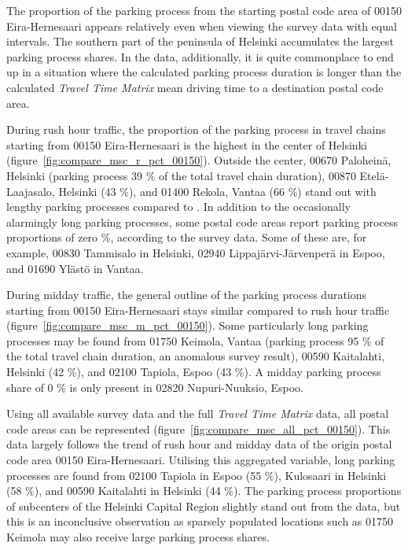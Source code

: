 The proportion of the parking process from the starting postal code area of 00150 Eira-Hernesaari appears relatively even when viewing the survey data with equal intervals. The southern part of the peninsula of Helsinki accumulates the largest parking process shares. In the  data, additionally, it is quite commonplace to end up in a situation where the calculated parking process duration is longer than the calculated \textit{Travel Time Matrix} mean driving time to a destination postal code area.

During rush hour traffic, the proportion of the parking process in travel chains starting from 00150 Eira-Hernesaari is the highest in the center of Helsinki (figure~\ref{fig:compare_msc_r_pct_00150}). Outside the center, 00670 Paloheinä, Helsinki (parking process 39 \% of the total travel chain duration), 00870 Etelä-Laajasalo, Helsinki (43 \%), and 01400 Rekola, Vantaa (66 \%) stand out with lengthy parking processes compared to . In addition to the occasionally alarmingly long parking processes, some postal code areas report parking process proportions of zero \%, according to the survey data. Some of these are, for example, 00830 Tammisalo in Helsinki, 02940 Lippajärvi-Järvenperä in Espoo, and 01690 Ylästö in Vantaa.

During midday traffic, the general outline of the parking process durations starting from 00150 Eira-Hernesaari stays similar compared to rush hour traffic (figure~\ref{fig:compare_msc_m_pct_00150}). Some particularly long parking processes may be found from 01750 Keimola, Vantaa (parking process 95 \% of the total travel chain duration, an anomalous survey result), 00590 Kaitalahti, Helsinki (42 \%), and 02100 Tapiola, Espoo (43 \%). A midday parking process share of 0 \% is only present in 02820 Nupuri-Nuuksio, Espoo.

Using all available survey data and the full \textit{Travel Time Matrix} data, all postal code areas can be represented (figure~\ref{fig:compare_msc_all_pct_00150}). This data largely follows the trend of rush hour and midday data of the origin postal code area 00150 Eira-Hernesaari. Utilising this aggregated variable, long parking processes are found from 02100 Tapiola in Espoo (55 \%), Kulosaari in Helsinki (58 \%), and 00590 Kaitalahti in Helsinki (44 \%). The parking process proportions of subcenters of the Helsinki Capital Region slightly stand out from the data, but this is an inconclusive observation as sparsely populated locations such as 01750 Keimola may also receive large parking process shares.

